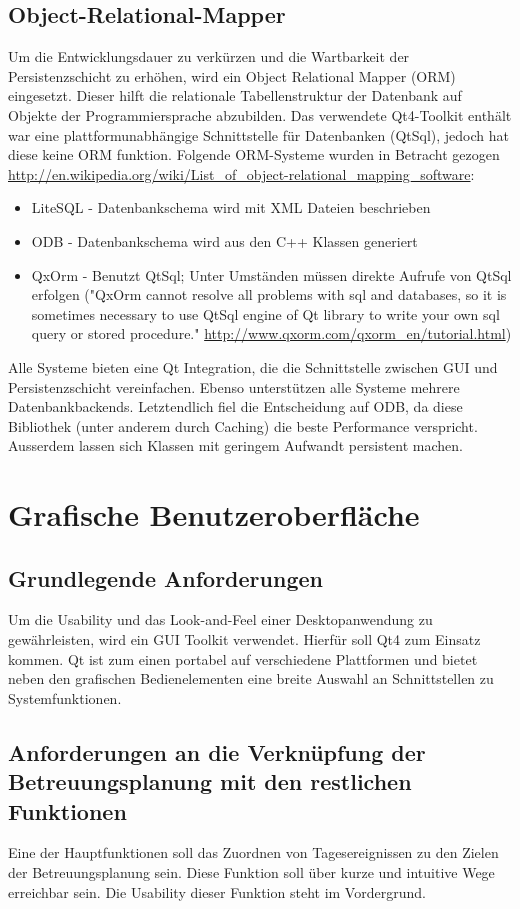 \documentclass[a4paper,10pt]{article}
\begin{document}
\subsection{Object-Relational-Mapper}
Um die Entwicklungsdauer zu verkürzen und die Wartbarkeit der Persistenzschicht zu erhöhen, wird ein Object Relational Mapper (ORM) eingesetzt. 
Dieser hilft die relationale Tabellenstruktur der Datenbank auf Objekte der Programmiersprache abzubilden.
Das verwendete Qt4-Toolkit enthält war eine plattformunabhängige Schnittstelle für Datenbanken (QtSql), jedoch hat diese keine ORM funktion.
Folgende ORM-Systeme wurden in Betracht gezogen \newline\url{http://en.wikipedia.org/wiki/List_of_object-relational_mapping_software}:
\begin{itemize}
	\item LiteSQL - Datenbankschema wird mit XML Dateien beschrieben
	\item ODB - Datenbankschema wird aus den C++ Klassen generiert
	\item QxOrm - Benutzt QtSql; Unter Umständen müssen direkte Aufrufe von QtSql erfolgen ("QxOrm cannot resolve all problems with sql and databases, so it is sometimes necessary to use QtSql engine of Qt library to write your own sql query or stored procedure." \url{http://www.qxorm.com/qxorm_en/tutorial.html})
\end{itemize}
Alle Systeme bieten eine Qt Integration, die die Schnittstelle zwischen GUI und Persistenzschicht vereinfachen. Ebenso unterstützen alle Systeme mehrere Datenbankbackends.
Letztendlich fiel die Entscheidung auf ODB, da diese Bibliothek (unter anderem durch Caching) die beste Performance verspricht. Ausserdem lassen sich Klassen mit geringem Aufwandt persistent machen.


\section{Grafische Benutzeroberfläche}
\subsection{Grundlegende Anforderungen}
Um die Usability und das Look-and-Feel einer Desktopanwendung zu gewährleisten, wird ein GUI Toolkit verwendet.
Hierfür soll Qt4 zum Einsatz kommen. Qt ist zum einen portabel auf verschiedene Plattformen 
und bietet neben den grafischen Bedienelementen eine breite Auswahl an Schnittstellen zu Systemfunktionen.
\subsection{Anforderungen an die Verknüpfung der Betreuungsplanung mit den restlichen Funktionen}
Eine der Hauptfunktionen soll das Zuordnen von Tagesereignissen zu den Zielen der Betreuungsplanung sein. Diese Funktion soll über 
kurze und intuitive Wege erreichbar sein. Die Usability dieser Funktion steht im Vordergrund.
\end{document}
